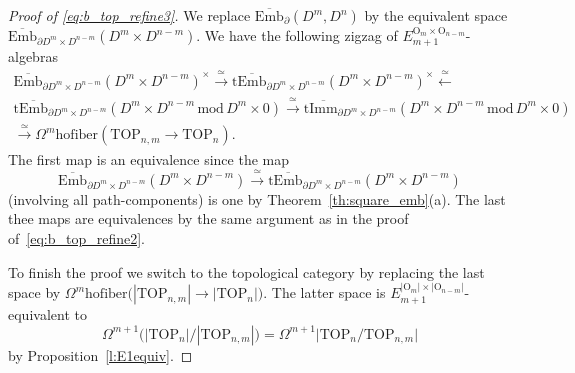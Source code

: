 \documentclass[11pt]{amsart}
\theoremstyle{definition}
\newcommand{\Ebar}{\overline{\mathrm{Emb}}}
\newcommand{\Imm}{\mathrm{Imm}}
\newcommand{\TOP}{\mathrm{TOP}}
\newcommand{\OO}{\mathrm{O}}
\newcommand{\mmod}{\,\mathrm{mod}\,}
\newcommand{\hofiber}{\mathrm{hofiber}}
\numberwithin{equation}{section}
\begin{document}
\begin{proof}[Proof of \eqref{eq:b_top_refine3}]
We replace $\Ebar_\partial(D^m,D^n)$ by the equivalent space $\Ebar_{\partial D^m\times D^{n-m}}(D^m\times D^{n-m})$.
We have the following zigzag of $E_{m+1}^{\OO_m\times\OO_{n-m}}$-algebras
\begin{multline}\label{eq:proof_top_refine3}
\Ebar_{\partial D^m\times D^{n-m}}(D^m\times D^{n-m})^\times\xrightarrow{\,\simeq\,} 
\mathrm{t}\Ebar_{\partial D^m\times D^{n-m}}(D^m\times D^{n-m})^\times\xleftarrow{\,\simeq\,}\\
\mathrm{t}\Ebar_{\partial D^m\times D^{n-m}}(D^m\times D^{n-m}\mmod D^m\times 0)
\xrightarrow{\,\simeq\,} 
\mathrm{t}\overline{\Imm}_{\partial D^m\times D^{n-m}}(D^m\times D^{n-m}\mmod D^m\times 0)\\
\xrightarrow{\,\simeq\,} 
\Omega^m\hofiber\left(\TOP_{n,m}\to\TOP_n\right).
\end{multline}
The first map is an equivalence since the map 
\[
\Ebar_{\partial D^m\times D^{n-m}}(D^m\times D^{n-m})\xrightarrow{\,\simeq\,} 
\mathrm{t}\Ebar_{\partial D^m\times D^{n-m}}(D^m\times D^{n-m})
\]
(involving all path-components) is one by Theorem~\ref{th:square_emb}(a). The last thee maps are equivalences by the same argument 
as in the proof of~\eqref{eq:b_top_refine2}. %

To finish the proof we switch to the topological category by replacing the last space by $\Omega^m\hofiber\bigl(
|\TOP_{n,m}|\to|\TOP_{n}|\bigr)$. The latter space is $E_{m+1}^{|\OO_m|\times|\OO_{n-m}|}$-equivalent to
\[
\Omega^{m+1}\bigl(|\TOP_n|/|\TOP_{n,m}|\bigr)=\Omega^{m+1}\bigl|\TOP_n/\TOP_{n,m}\bigr|
\]
by Proposition~\ref{l:E1equiv}.
\end{proof}
\end{document}
